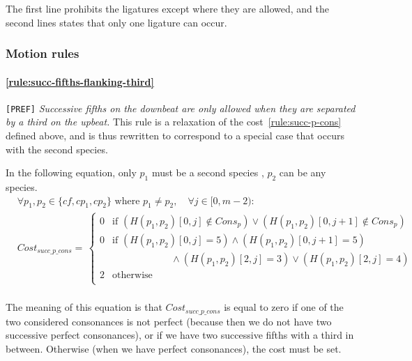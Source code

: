     The first line prohibits the ligatures except where they are allowed, and the second lines states that only one ligature can occur.

\subsubsection{Motion rules}
\paragraph{\hspace{.6cm}\ref{rule:succ-fifths-flanking-third}} \texttt{[PREF]} \textit{Successive fifths on the downbeat are only allowed when they are separated by a third on the upbeat.}    
    This rule is a relaxation of the cost~\ref{rule:succ-p-cons} defined above, and is thus rewritten to correspond to a special case that occurs with the second species.
        
    In the following equation, only $p_1$ must be a second species \cp, $p_2$ can be any species.
    \begin{equation}
        \begin{aligned}
            & \forall p_1, p_2 \in \{cf, cp_1, cp_2\} \text{ where }  p_1 \neq p_2, \quad \forall j \in [0, m-2): \\
            &Cost_{succ\_p\_cons} = \,  
            \begin{cases}
                0 & \text{if } (H(p_1, p_2)[0, j] \notin Cons_p) \lor (H(p_1, p_2)[0, j+1] \notin Cons_p)\\
                0 & \text{if } (H(p_1, p_2)[0, j] = 5 ) \land (H(p_1, p_2)[0, j+1] = 5) \\
                & \quad \quad \quad \quad \quad \quad\land (H(p_1, p_2)[2, j] = 3) \lor (H(p_1, p_2)[2, j] = 4)\\
                2 & \text{otherwise } \\
            \end{cases}\\
        \end{aligned}
    \end{equation}

    The meaning of this equation is that $Cost_{succ\_p\_cons}$ is equal to zero if one of the two considered consonances is not perfect (because then we do not have two successive perfect consonances), or if we have two successive fifths with a third in between. Otherwise (when we have perfect consonances), the cost must be set.

